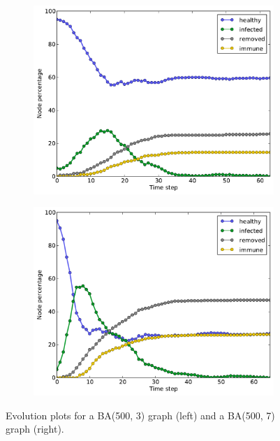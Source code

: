 \documentclass[11pt]{article} %
\begin{document}
\begin{figure}[tb]
  \begin{subfigure}[b]{0.5\textwidth}
    \centering
    \includegraphics[width=\textwidth]{figures/evo_BA_500_3}
  \end{subfigure}
  \begin{subfigure}[b]{0.5\textwidth}
    \centering
    \includegraphics[width=\textwidth]{figures/evo_BA_500_7}
  \end{subfigure}
  \caption{Evolution plots for a BA(500, 3) graph (left) and a
    BA(500, 7) graph (right).}
  \label{fig:ba_evo}
\end{figure}
\end{document}
